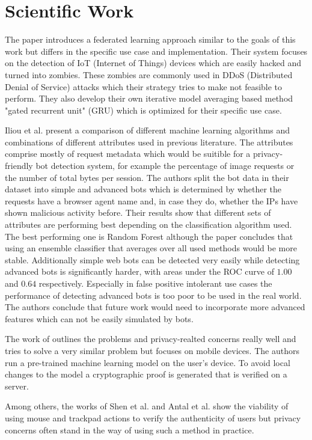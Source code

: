 \documentclass[
    fontsize=12pt,
    headings=small,
    parskip=half,           %
    bibliography=totoc,
    numbers=noenddot,       %
    open=any,               %
    final                   %
    ]{scrreprt}
\begin{document}
\section{Scientific Work}

The paper \cite{LiJi2021} introduces a federated learning approach similar to the goals of this work but differs in the specific use case and implementation. Their system focuses on the detection of IoT (Internet of Things) devices which are easily hacked and turned into zombies. These zombies are commonly used in DDoS (Distributed Denial of Service) attacks which their strategy tries to make not feasible to perform. They also develop their own iterative model averaging based method "gated recurrent unit" (GRU) which is optimized for their specific use case.

Iliou et al. \cite{10.1145/3339252.3339267} present a comparison of different machine learning algorithms and combinations of different attributes used in previous literature. The attributes comprise mostly of request metadata which would be suitible for a privacy-friendly bot detection system, for example the percentage of image requests or the number of total bytes per session. The authors split the bot data in their dataset into simple and advanced bots which is determined by whether the requests have a browser agent name and, in case they do, whether the IPs have shown malicious activity before. Their results show that different sets of attributes are performing best depending on the classification algorithm used. The best performing one is Random Forest although the paper concludes that using an ensemble classifier that averages over all used methods would be more stable. Additionally simple web bots can be detected very easily while detecting advanced bots is significantly harder, with areas under the ROC curve of $1.00$ and $0.64$ respectively. Especially in false positive intolerant use cases the performance of detecting advanced bots is too poor to be used in the real world. The authors conclude that future work would need to incorporate more advanced features which can not be easily simulated by bots.

The work of \cite{PETS2021} outlines the problems and privacy-realted concerns really well and tries to solve a very similar problem but focuses on mobile devices. The authors run a pre-trained machine learning model on the user's device. To avoid local changes to the model a cryptographic proof is generated that is verified on a server.

Among others, the works of Shen et al. \cite{6263955} and Antal et al. \cite{9111596} \cite{DBLP:journals/corr/abs-1810-04668} show the viability of using mouse and trackpad actions to verify the authenticity of users but privacy concerns often stand in the way of using such a method in practice.
\end{document}
